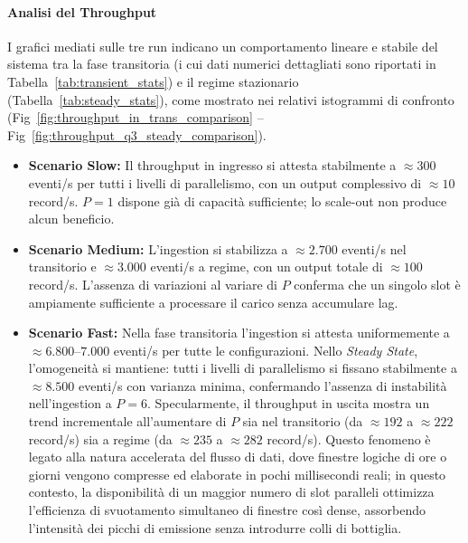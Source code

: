 \documentclass[conference]{IEEEtran}
\begin{document}
\paragraph{Analisi del Throughput}
I grafici mediati sulle tre run indicano un comportamento lineare e stabile del sistema tra la fase transitoria (i cui dati numerici dettagliati sono riportati in Tabella~\ref{tab:transient_stats}) e il regime stazionario (Tabella~\ref{tab:steady_stats}), come mostrato nei relativi istogrammi di confronto (Fig~\ref{fig:throughput_in_trans_comparison} -- Fig~\ref{fig:throughput_q3_steady_comparison}).
\begin{itemize}
    \item \textbf{Scenario Slow:} Il throughput in ingresso si attesta stabilmente a $\approx 300$ eventi/s per tutti i livelli di parallelismo, con un output complessivo di $\approx 10$ record/s. $P=1$ dispone già di capacità sufficiente; lo scale-out non produce alcun beneficio.
    \item \textbf{Scenario Medium:} L'ingestion si stabilizza a $\approx 2.700$ eventi/s nel transitorio e $\approx 3.000$ eventi/s a regime, con un output totale di $\approx 100$ record/s. L'assenza di variazioni al variare di $P$ conferma che un singolo slot è ampiamente sufficiente a processare il carico senza accumulare lag.
    \item \textbf{Scenario Fast:} Nella fase transitoria l'ingestion si attesta uniformemente a $\approx 6.800\text{--}7.000$ eventi/s per tutte le configurazioni. Nello \textit{Steady State}, l'omogeneità si mantiene: tutti i livelli di parallelismo si fissano stabilmente a $\approx 8.500$ eventi/s con varianza minima, confermando l'assenza di instabilità nell'ingestion a $P=6$. Specularmente, il throughput in uscita mostra un trend incrementale all'aumentare di $P$ sia nel transitorio (da $\approx 192$ a $\approx 222$ record/s) sia a regime (da $\approx 235$ a $\approx 282$ record/s). Questo fenomeno è legato alla natura accelerata del flusso di dati, dove finestre logiche di ore o giorni vengono compresse ed elaborate in pochi millisecondi reali; in questo contesto, la disponibilità di un maggior numero di slot paralleli ottimizza l'efficienza di svuotamento simultaneo di finestre così dense, assorbendo l'intensità dei picchi di emissione senza introdurre colli di bottiglia.
\end{itemize}
\end{document}
